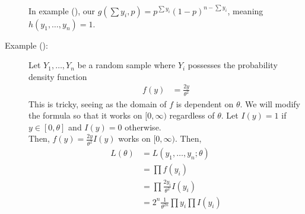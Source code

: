 \documentclass[10pt]{extarticle}
\begin{document}
\begin{description}
      In example (\textasteriskcentered), our $g(\sum y_i,p) = p^{\sum y_i}(1-p)^{n-\sum y_i}$, meaning $h(y_1,\dots,y_n) = 1$. 
    \item[Example (\textasteriskcentered\textasteriskcentered):] Let $Y_1,\dots,Y_n$ be a random sample where $Y_i$ possesses the probability density function
      \begin{align*}
        f(y) &= \frac{2y}{\theta^2} \tag*{on $[0,\theta]$.}
      \end{align*}
      This is tricky, seeing as the domain of $f$ is dependent on $\theta$. We will modify the formula so that it works on $[0,\infty)$ regardless of $\theta$. Let $I(y) = 1$ if $y \in [0,\theta]$ and $I(y) = 0$ otherwise.\\

      Then, $f(y) = \frac{2y}{\theta^2}I(y)$ works on $[0,\infty)$. Then,
      \begin{align*}
        L(\theta) &= L(y_1,\dots,y_n;\theta)\\
                  &= \prod f(y_i)\\
                  &= \prod \frac{2y_i}{\theta^2}I(y_i)\\
                  &= 2^{n}\frac{1}{\theta^{2n}} \prod y_i \prod I(y_i)
      \end{align*}
  \end{description}
\end{document}
